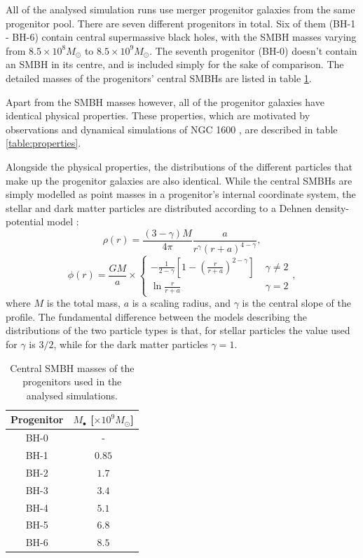 \documentclass[english, oneside]{HYgradu}
\begin{document}
All of the analysed simulation runs use merger progenitor galaxies from the same progenitor pool. There are seven different progenitors in total. Six of them (BH-1 - BH-6) contain central supermassive black holes, with the SMBH masses varying from $8.5 \times 10^8 M_\odot$ to $8.5 \times 10^9 M_\odot$. The seventh progenitor (BH-0) doesn't contain an SMBH in its centre, and is included simply for the sake of comparison. The detailed masses of the progenitors' central SMBHs are listed in table \ref{table:progenitors}. 

Apart from the SMBH masses however, all of the progenitor galaxies have identical physical properties. These properties, which are motivated by observations and dynamical simulations of NGC 1600 \citep{Rantala2018}, are described in table \ref{table:properties}.

Alongside the physical properties, the distributions of the different particles that make up the progenitor galaxies are also identical. While the central SMBHs are simply modelled as point masses in a progenitor's internal coordinate system, the stellar and dark matter particles are distributed according to a Dehnen density-potential model \citep{Dehnen1993}:
\begin{equation}
\rho(r) = \frac{(3-\gamma)M}{4\pi} \frac{a}{r^\gamma (r+a)^{4-\gamma}},
\end{equation}
\begin{equation}
\phi(r) = \frac{GM}{a} \times 
\begin{cases}
	-\frac{1}{2-\gamma} \left[ 1 - \left( \frac{r}{r+a} \right)^{2-\gamma} \right] & \; \gamma \neq 2 \\
	\ln \frac{r}{r+a}	 & \; \gamma = 2
\end{cases},
\end{equation}
where $M$ is the total mass, $a$ is a scaling radius, and $\gamma$ is the central slope of the profile. The fundamental difference between the models describing the distributions of the two particle types is that, for stellar particles the value used for $\gamma$  is $3/2$, while for the dark matter particles $\gamma = 1$.

\begin{table}
	\begin{center}
		\begin{tabular}{c c}
		\hline
		\hline
		Progenitor & $M_\bullet$ [$\times 10^9 M_\odot$] \\
		\hline
		BH-0 & - \\
		BH-1 & $0.85$ \\
		BH-2 & $1.7$ \\
		BH-3 & $3.4$ \\
		BH-4 & $5.1$ \\
		BH-5 & $6.8$ \\
		BH-6 & $8.5$ \\
		\hline
		\end{tabular}
	\end{center}
	\caption{Central SMBH masses of the progenitors used in the analysed simulations.}
	\label{table:progenitors}
\end{table}
\end{document}
